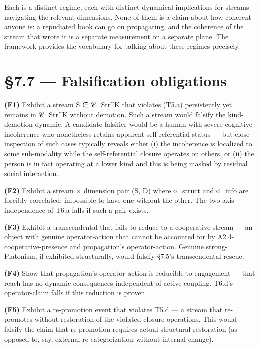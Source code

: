 \documentclass[11pt, openany]{book}
\newcommand{\sectionbreak}{\clearpage}
\begin{document}
Each is a distinct regime, each with distinct dynamical implications for streams navigating the relevant dimensions. None of them is a claim about how coherent anyone is: a repudiated book can go on propagating, and the coherence of the stream that wrote it is a separate measurement on a separate plane. The framework provides the vocabulary for talking about these regimes precisely.

\sectionbreak

\section{§7.7 --- Falsification obligations}

\textbf{(F1)} Exhibit a stream S ∈ 𝒞\_\allowbreak{}Str\textasciicircum{}K that violates (T5.a) persistently yet remains in 𝒞\_\allowbreak{}Str\textasciicircum{}K without demotion. Such a stream would falsify the kind-demotion dynamic. A candidate falsifier would be a human with severe cognitive incoherence who nonetheless retains apparent self-referential status --- but close inspection of such cases typically reveals either (i) the incoherence is localized to some sub-modality while the self-referential closure operates on others, or (ii) the person is in fact operating at a lower kind and this is being masked by residual social interaction.

\textbf{(F2)} Exhibit a stream × dimension pair (S, D) where σ\_\allowbreak{}struct and σ\_\allowbreak{}info are forcibly-correlated: impossible to have one without the other. The two-axis independence of T6.a falls if such a pair exists.

\textbf{(F3)} Exhibit a transcendental that fails to reduce to a cooperative-stream --- an object with genuine operator-action that cannot be accounted for by A2.4-cooperative-presence and propagation's operator-action. Genuine strong-Platonism, if exhibited structurally, would falsify §7.5's transcendental-rescue.

\textbf{(F4)} Show that propagation's operator-action is reducible to engagement --- that reach has no dynamic consequences independent of active coupling. T6.d's operator-claim falls if this reduction is proven.

\textbf{(F5)} Exhibit a re-promotion event that violates T5.d --- a stream that re-promotes without restoration of the violated closure operations. This would falsify the claim that re-promotion requires actual structural restoration (as opposed to, say, external re-categorization without internal change).
\end{document}
